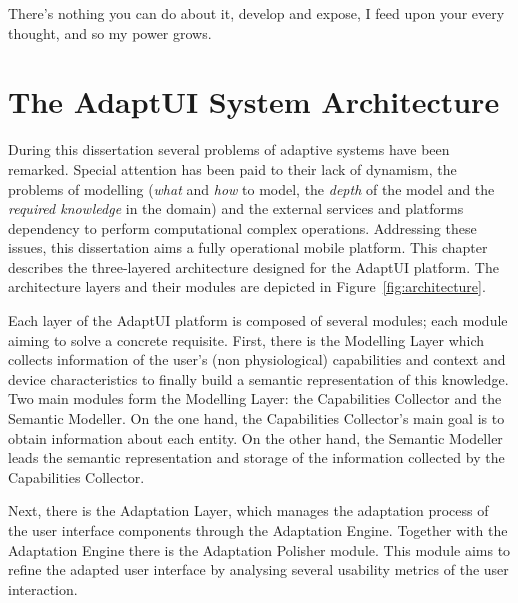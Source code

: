
\begin{savequote}[50mm]
There's nothing you can do about it, develop and expose, I feed upon your every 
thought, and so my power grows.
\end{savequote}


\chapter{The AdaptUI System Architecture}
\label{cha:architecture}

\ifpdf
    \graphicspath{{4_system_architecture/figures/PNG/}{4_system_architecture/figures/PDF/}{4_system_architecture/figures/}}
\else
    \graphicspath{{4_system_architecture/figures/EPS/}{4_system_architecture/figures/}}
\fi

During this dissertation several problems of adaptive systems have been remarked.
Special attention has been paid to their lack of dynamism, the problems of 
modelling (\textit{what} and \textit{how} to model, the \textit{depth} of the 
model and the \textit{required knowledge} in the domain) and the external 
services and platforms dependency to perform computational complex operations. 
Addressing these issues, this dissertation aims a fully operational mobile 
platform. This chapter describes the three-layered architecture designed for 
the AdaptUI platform. The architecture layers and their modules are depicted in 
Figure~\ref{fig:architecture}.

Each layer of the AdaptUI platform is composed of several modules; each module
aiming to solve a concrete requisite. First, there is the Modelling Layer which
collects information of the user's (non physiological) capabilities and context
and device characteristics to finally build a semantic representation of this
knowledge. Two main modules form the Modelling Layer: the Capabilities Collector
and the Semantic Modeller. On the one hand, the Capabilities Collector's main
goal is to obtain information about each entity. On the other hand, the Semantic
Modeller leads the semantic representation and storage of the information
collected by the Capabilities Collector.

Next, there is the Adaptation Layer, which manages the adaptation process of the
user interface components through the Adaptation Engine. Together with the
Adaptation Engine there is the Adaptation Polisher module. This module aims to
refine the adapted user interface by analysing several usability metrics of the
user interaction.

